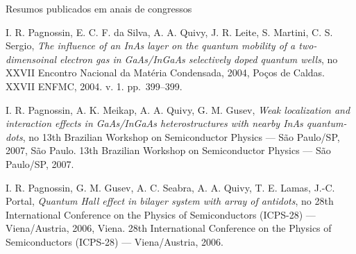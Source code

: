 \begin{compactitem}
  \item Resumos publicados em anais de congressos
  \begin{compactitem}
    \item I. R. Pagnossin, E. C. F. da Silva, A. A. Quivy, J. R. Leite, S. Martini, C. S. Sergio, \textsl{The influence of an InAs layer on the quantum mobility of a two-dimensoinal electron gas in GaAs/InGaAs selectively doped quantum wells}, no XXVII Encontro Nacional da Matéria Condensada, 2004, Poços de Caldas. XXVII ENFMC, 2004. v. 1. pp.~399--399.
    \item I. R. Pagnossin, A. K. Meikap, A. A. Quivy, G. M. Gusev, \textsl{Weak localization and interaction effects in GaAs/InGaAs heterostructures with nearby InAs quantum-dots}, no 13th Brazilian Workshop on Semiconductor Physics --- São Paulo/SP, 2007, São Paulo. 13th Brazilian Workshop on Semiconductor Physics --- São Paulo/SP, 2007.
    \item I. R. Pagnossin, G. M. Gusev, A. C. Seabra, A. A. Quivy, T. E. Lamas, J.-C. Portal, \textsl{Quantum Hall effect in bilayer system with array of antidots}, no 28th International Conference on the Physics of Semiconductors (ICPS-28) --- Viena/Austria, 2006, Viena. 28th International Conference on the Physics of Semiconductors (ICPS-28) --- Viena/Austria, 2006.	
  \end{compactitem}
	

\end{compactitem}
